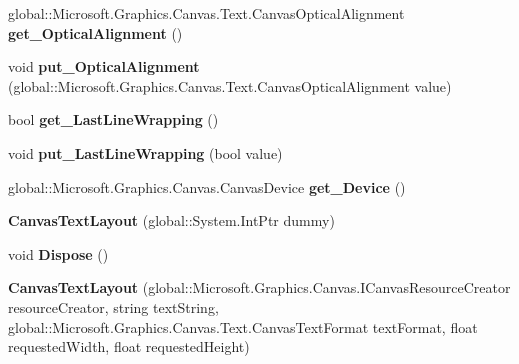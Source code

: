 \begin{DoxyCompactItemize}
global\+::\+Microsoft.\+Graphics.\+Canvas.\+Text.\+Canvas\+Optical\+Alignment {\bfseries get\+\_\+\+Optical\+Alignment} ()
\item 
\mbox{\label{class_microsoft_1_1_graphics_1_1_canvas_1_1_text_1_1_canvas_text_layout_af03396a3ef4783d99224c7d1ed1fb4c8}} 
void {\bfseries put\+\_\+\+Optical\+Alignment} (global\+::\+Microsoft.\+Graphics.\+Canvas.\+Text.\+Canvas\+Optical\+Alignment value)
\item 
\mbox{\label{class_microsoft_1_1_graphics_1_1_canvas_1_1_text_1_1_canvas_text_layout_aa574a94412591998ea88bcf6050fde56}} 
bool {\bfseries get\+\_\+\+Last\+Line\+Wrapping} ()
\item 
\mbox{\label{class_microsoft_1_1_graphics_1_1_canvas_1_1_text_1_1_canvas_text_layout_a23ffd7a9bc9689000496a12211b36095}} 
void {\bfseries put\+\_\+\+Last\+Line\+Wrapping} (bool value)
\item 
\mbox{\label{class_microsoft_1_1_graphics_1_1_canvas_1_1_text_1_1_canvas_text_layout_a63c18a3a380f4b86c17dc06ce7c426e1}} 
global\+::\+Microsoft.\+Graphics.\+Canvas.\+Canvas\+Device {\bfseries get\+\_\+\+Device} ()
\item 
\mbox{\label{class_microsoft_1_1_graphics_1_1_canvas_1_1_text_1_1_canvas_text_layout_aa0d12016b1d9631abf94ebe95eca05a0}} 
{\bfseries Canvas\+Text\+Layout} (global\+::\+System.\+Int\+Ptr dummy)
\item 
\mbox{\label{class_microsoft_1_1_graphics_1_1_canvas_1_1_text_1_1_canvas_text_layout_a7d35b539c782a63cef76d60d771100b9}} 
void {\bfseries Dispose} ()
\item 
\mbox{\label{class_microsoft_1_1_graphics_1_1_canvas_1_1_text_1_1_canvas_text_layout_a3e6e6ee905c4e104025e259714b4f387}} 
{\bfseries Canvas\+Text\+Layout} (global\+::\+Microsoft.\+Graphics.\+Canvas.\+I\+Canvas\+Resource\+Creator resource\+Creator, string text\+String, global\+::\+Microsoft.\+Graphics.\+Canvas.\+Text.\+Canvas\+Text\+Format text\+Format, float requested\+Width, float requested\+Height)

\end{DoxyCompactItemize}

